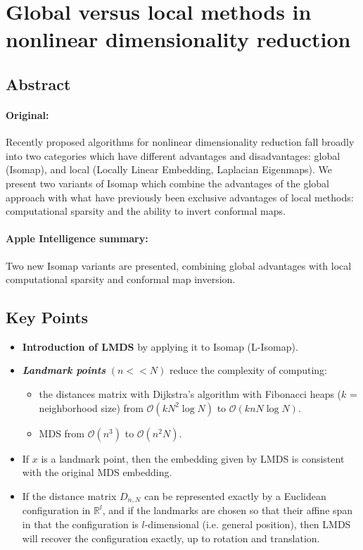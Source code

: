 \documentclass[a4paper,12pt]{article}
\begin{document}
\pagebreak
\section{Global versus local methods in nonlinear dimensionality reduction \texorpdfstring{\cite{deSilvaTenenbaum2002}}{}}
\label{sec:deSilvaTenenbaum2002}

\subsection{Abstract}

\paragraph{Original:} Recently proposed algorithms for nonlinear dimensionality reduction fall broadly into two categories which have different advantages and disadvantages: global (Isomap), and local (Locally Linear Embedding, Laplacian Eigenmaps). We present two variants of Isomap which combine the advantages of the global approach with what have previously been exclusive advantages of local methods: computational sparsity and the ability to invert conformal maps.

\paragraph{Apple Intelligence summary:} Two new Isomap variants are presented, combining global advantages with local computational sparsity and conformal map inversion.

\subsection{Key Points}

\begin{itemize}
    \item \textbf{Introduction of LMDS} by applying it to Isomap (L-Isomap).
    \item \textbf{\textit{Landmark points}} $(n << N)$ reduce the complexity of computing:
    \begin{itemize}
        \item the distances matrix with Dijkstra's algorithm with Fibonacci heaps ($k$ = neighborhood size) from $\mathcal{O}(kN^2\log N)$ to $\mathcal{O}(knN\log N)$.
        \item MDS from $\mathcal{O}(n^3)$ to $\mathcal{O}(n^2N)$.
    \end{itemize}
    \item If $x$ is a landmark point, then the embedding given by LMDS is consistent with the original MDS embedding.
    \item If the distance matrix $D_{n,N}$ can be represented exactly by a Euclidean configuration in $\mathbb{R}^l$, and if the landmarks are chosen so that their affine span in that the configuration is $l$-dimensional (i.e. general position), then LMDS will recover the configuration exactly, up to rotation and translation.
\end{itemize}
\end{document}
